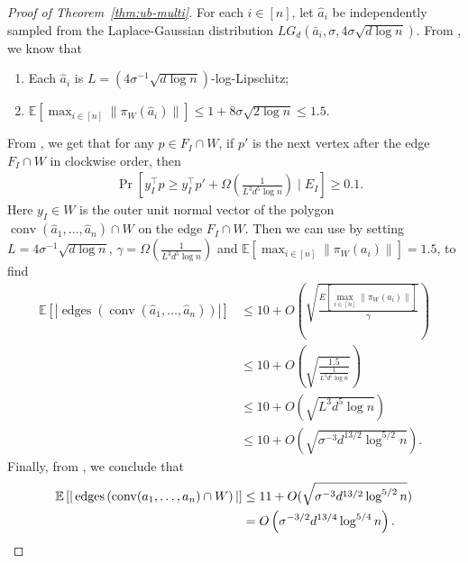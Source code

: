 \documentclass{article}\usepackage[a4paper,margin=20mm]{geometry}
\newcommand{\E}{\mathbb E}
\newcommand{\conv}{\operatorname{conv}}
\newcommand{\edges}{\operatorname{edges}}
\begin{document}
\begin{proof}[Proof of Theorem~\ref{thm:ub-multi}]
    For each $i \in [n]$, let $\hat{a}_i$ be independently sampled from the Laplace-Gaussian distribution $LG_d(\bar{a}_i, \sigma, 4\sigma \sqrt{d\log n})$.
    From , we know that
    \begin{enumerate}
        \item Each $\hat{a}_i$ is $L = (4\sigma^{-1} \sqrt{d\log n})$-log-Lipschitz;
        \item $\E[\max_{i\in [n]}\|\pi_W(\hat{a}_i)\|] \leq 1 + 8\sigma \sqrt{2 \log n} \leq 1.5$.
    \end{enumerate}

    From , we get that for any $p \in F_I \cap W$, if $p'$ is the next vertex after the edge $F_I \cap W$ in clockwise order, then
    \begin{align*}
        & \Pr[y_I^\top p \geq y_I^\top p' + \Omega(\frac{1}{L^3d^5\log n}) \mid E_I] \geq  0.1.
    \end{align*}
    Here $y_I \in W$ is the outer unit normal vector of the polygon $\conv(\hat{a}_1, \ldots, \hat{a}_n) \cap W$ on the edge $F_I \cap W$.
    Then we can use
     by setting $L = 4\sigma^{-1} \sqrt{d\log n}$, $\gamma = \Omega(\frac{1}{L^3d^5 \log n})$
    and $\E[\max_{i \in [n]}\|\pi_W(a_i)\|]  = 1.5$, to find
    \begin{align*}
        \E\left[ |\edges\left(\conv(\hat{a}_1, \ldots, \hat{a}_n) \right) |\right]
        &\leq 10  + O(\sqrt{\frac{E[\max_{i \in [n]}\|\pi_W(a_i)\|]}{\gamma}}) \\
        &\leq 10 + O(\sqrt{\frac{1.5}{\frac{1}{L^3d^5 \log n}}}) \\
        &\leq 10 + O(\sqrt{L^3d^5 \log n}) \\
         &\leq  10 + O(\sqrt{\sigma^{-3} d^{13/2}  \log^{5/2} n}).
    \end{align*}
    Finally, from , we conclude that
    \begin{align*}
        \E\left[ |\edges\left(\conv(a_1, \ldots, a_n) \cap W \right) |\right] &\leq  11 + O(\sqrt{\sigma^{-3} d^{13/2}  \log^{5/2} n}) \\
        &= O\left(\sigma^{-3/2} d^{13/4} \log^{5/4} n  \right) .\qedhere
    \end{align*}
\end{proof}
\end{document}
